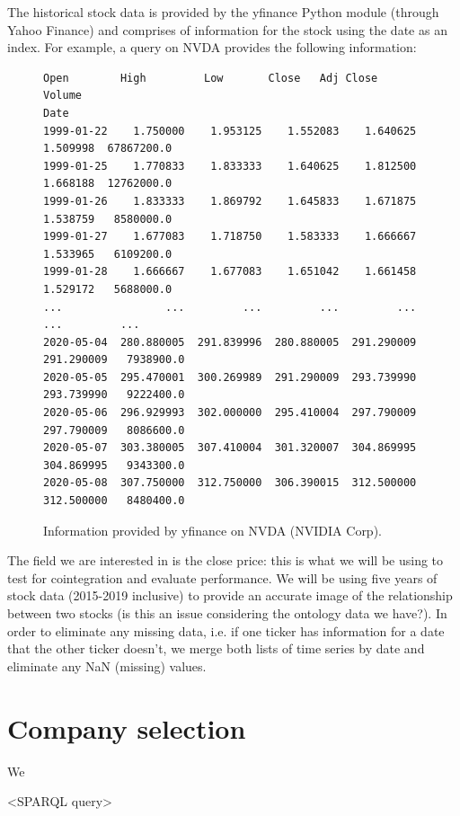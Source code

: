 \documentclass{UoYCSproject}
\begin{document}
The historical stock data is provided by the yfinance Python module (through Yahoo Finance) \parencite{yfinance} and comprises of information for the stock using the date as an index. For example, a query on NVDA provides the following information:

\begin{figure}[h]
\begin{lstlisting}[basicstyle=\scriptsize, columns=fullflexible]
                  Open        High         Low       Close   Adj Close      Volume
Date                                                                              
1999-01-22    1.750000    1.953125    1.552083    1.640625    1.509998  67867200.0
1999-01-25    1.770833    1.833333    1.640625    1.812500    1.668188  12762000.0
1999-01-26    1.833333    1.869792    1.645833    1.671875    1.538759   8580000.0
1999-01-27    1.677083    1.718750    1.583333    1.666667    1.533965   6109200.0
1999-01-28    1.666667    1.677083    1.651042    1.661458    1.529172   5688000.0
...                ...         ...         ...         ...         ...         ...
2020-05-04  280.880005  291.839996  280.880005  291.290009  291.290009   7938900.0
2020-05-05  295.470001  300.269989  291.290009  293.739990  293.739990   9222400.0
2020-05-06  296.929993  302.000000  295.410004  297.790009  297.790009   8086600.0
2020-05-07  303.380005  307.410004  301.320007  304.869995  304.869995   9343300.0
2020-05-08  307.750000  312.750000  306.390015  312.500000  312.500000   8480400.0
\end{lstlisting}
\caption{Information provided by yfinance on NVDA (NVIDIA Corp).}
\end{figure}

The field we are interested in is the close price: this is what we will be using to test for cointegration and evaluate performance. We will be using five years of stock data (2015-2019 inclusive) to provide an accurate image of the relationship between two stocks (is this an issue considering the ontology data we have?). In order to eliminate any missing data, i.e. if one ticker has information for a date that the other ticker doesn't, we merge both lists of time series by date and eliminate any NaN (missing) values.

\section{Company selection}

We

<SPARQL query>
\end{document}
